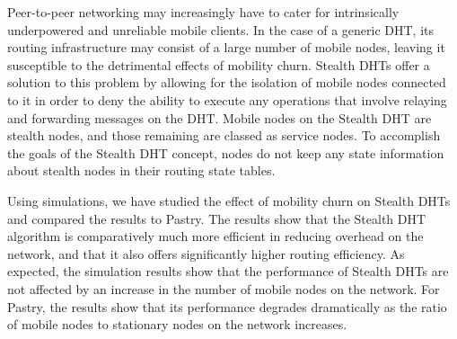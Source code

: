 \documentclass[times, 10pt,twocolumn]{article}
\begin{document}
%

 \label{conclusion}

Peer-to-peer networking may increasingly have to cater for
intrinsically underpowered and unreliable mobile clients. In the
case of a generic DHT, its routing infrastructure may consist of a
large number of mobile nodes, leaving it susceptible to the
detrimental effects of mobility churn. Stealth DHTs offer a solution
to this problem by allowing for the isolation of mobile nodes
connected to it in order to deny the ability to execute any
operations that involve relaying and forwarding messages on the DHT.
Mobile nodes on the Stealth DHT are stealth nodes, and those
remaining are classed as service nodes. To accomplish the goals of
the Stealth DHT concept, nodes do not keep any state information
about stealth nodes in their routing state tables.

Using simulations, we have studied the effect of mobility churn on
Stealth DHTs and compared the results to Pastry. The results show
that the Stealth DHT algorithm is comparatively much more efficient
in reducing overhead on the network, and that it also offers
significantly higher routing efficiency. As expected, the simulation
results show that the performance of Stealth DHTs are not affected
by an increase in the number of mobile nodes on the network. For
Pastry, the results show that its performance degrades dramatically
as the ratio of mobile nodes to stationary nodes on the network
increases.



\end{document}
